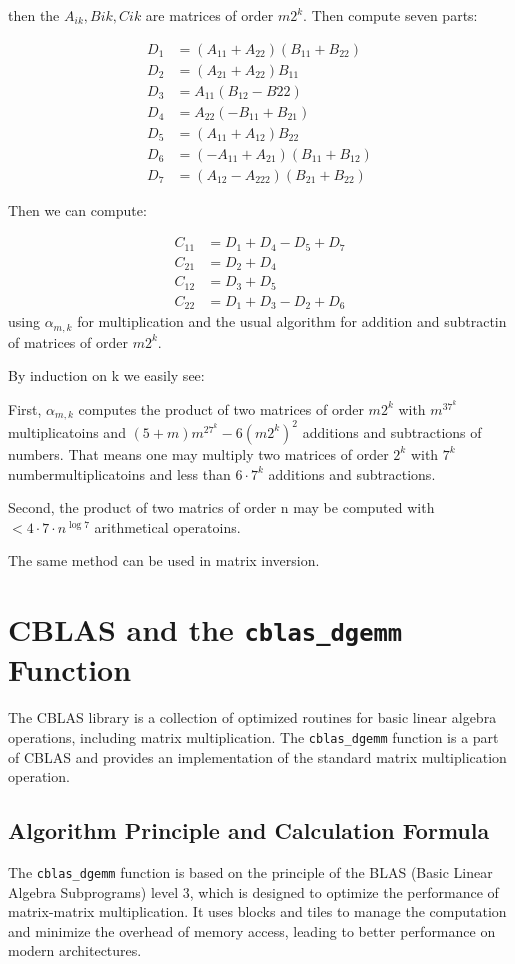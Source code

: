 \documentclass{article}
\begin{document}
then the $A_{ik},B{ik},C{ik}$ are matrices of order $m2^k$. Then compute seven parts:


\begin{align}
  D_1 &= (A_{11} + A_{22})(B_{11}+B_{22}) \\
  D_2 &= (A_{21}+ A_{22})B_{11} \\
  D_3 &= A_{11}(B_{12}-B{22}) \\
  D_4 &= A_{22}(-B_{11}+B_{21}) \\
  D_5 &= (A_{11}+A_{12})B_{22} \\
  D_6 &= (-A_{11}+A_{21})(B_{11}+B_{12}) \\
  D_7 &= (A_{12}-A_{222})(B_{21}+B_{22})
\end{align}

Then we can compute:

\begin{align}
  C_{11} &= D_1 + D_4 - D_5 + D_7 \\
  C_{21} &= D_2 + D_4 \\
  C_{12} &= D_3 + D_5 \\
  C_{22} &= D_1 + D_3 - D_2 + D_6
\end{align}
using $\alpha_{m,k}$ for multiplication and the usual algorithm for addition and subtractin of matrices of order $m2^k$.

By induction on k we easily see:

First, $\alpha_{m, k}$ computes the product of two matrices of order $m2^k$ with $m^37^k$ multiplicatoins and $(5+m)m^27^k-6(m2^k)^2$ additions and subtractions of numbers.
That means one may multiply two matrices of order $2^k$ with $7^k$ numbermultiplicatoins and less than $6 \cdot 7^k$ additions and subtractions.

Second, the product of two matrics of order n may be computed with $<4 \cdot 7 \cdot n^{\log 7}$ arithmetical operatoins.

The same method can be used in matrix inversion.
\section{CBLAS and the \texttt{cblas\_dgemm} Function}
The CBLAS library is a collection of optimized routines for basic linear algebra operations, including matrix multiplication. The \texttt{cblas\_dgemm} function is a part of CBLAS and provides an implementation of the standard matrix multiplication operation.

\subsection{Algorithm Principle and Calculation Formula}
The \texttt{cblas\_dgemm} function is based on the principle of the BLAS (Basic Linear Algebra Subprograms) level 3, which is designed to optimize the performance of matrix-matrix multiplication. It uses blocks and tiles to manage the computation and minimize the overhead of memory access, leading to better performance on modern architectures.
\end{document}
